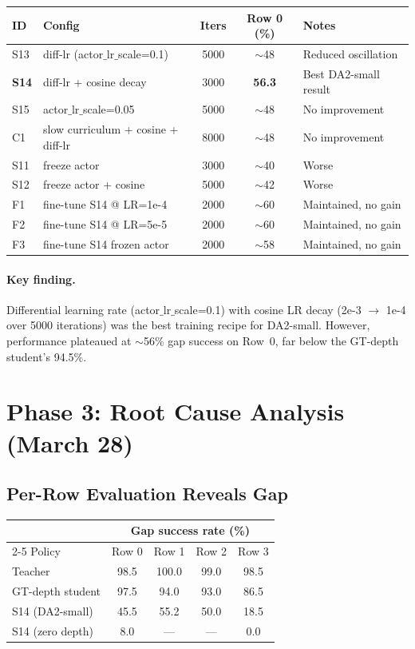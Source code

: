 \documentclass[11pt,a4paper]{article}
\newcommand{\best}[1]{\textcolor{best}{\textbf{#1}}}
\begin{document}
\begin{center}
\begin{tabular}{l l c c l}
\toprule
ID & Config & Iters & Row 0 (\%) & Notes \\
\midrule
S13 & diff-lr (actor$\_$lr$\_$scale=0.1) & 5000 & $\sim$48 & Reduced oscillation \\
\best{S14} & diff-lr + cosine decay & 3000 & \best{56.3} & Best DA2-small result \\
S15 & actor$\_$lr$\_$scale=0.05 & 5000 & $\sim$48 & No improvement \\
C1  & slow curriculum + cosine + diff-lr & 8000 & $\sim$48 & No improvement \\
S11 & freeze actor & 3000 & $\sim$40 & Worse \\
S12 & freeze actor + cosine & 5000 & $\sim$42 & Worse \\
F1  & fine-tune S14 @ LR=1e-4 & 2000 & $\sim$60 & Maintained, no gain \\
F2  & fine-tune S14 @ LR=5e-5 & 2000 & $\sim$60 & Maintained, no gain \\
F3  & fine-tune S14 frozen actor & 2000 & $\sim$58 & Maintained, no gain \\
\bottomrule
\end{tabular}
\end{center}

\paragraph{Key finding.}  Differential learning rate (actor$\_$lr$\_$scale=0.1)
with cosine LR decay (2e-3 $\to$ 1e-4 over 5000 iterations) was the best
training recipe for DA2-small.  However, performance plateaued at $\sim$56\%
gap success on Row~0, far below the GT-depth student's 94.5\%.

\section{Phase 3: Root Cause Analysis (March 28)}

\subsection{Per-Row Evaluation Reveals Gap}

\begin{center}
\begin{tabular}{l cccc}
\toprule
& \multicolumn{4}{c}{Gap success rate (\%)} \\
\cmidrule(lr){2-5}
Policy & Row 0 & Row 1 & Row 2 & Row 3 \\
\midrule
Teacher         & 98.5 & 100.0 & 99.0 & 98.5 \\
GT-depth student & 97.5 & 94.0 & 93.0 & 86.5 \\
S14 (DA2-small) & 45.5 & 55.2 & 50.0 & 18.5 \\
S14 (zero depth) & 8.0  & ---   & ---   & 0.0 \\
\bottomrule
\end{tabular}
\end{center}
\end{document}
